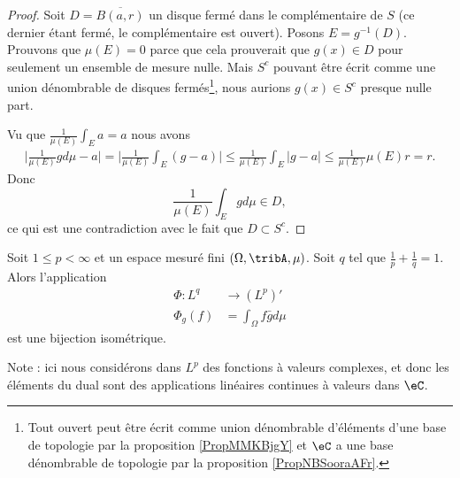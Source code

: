 \begin{proof}
    Soit \( D=\overline{ B(a,r) }\) un disque fermé dans le complémentaire de \( S\) (ce dernier étant fermé, le complémentaire est ouvert). Posons \( E=g^{-1}(D)\). Prouvons que \( \mu(E)=0\) parce que cela prouverait que \( g(x)\in D\) pour seulement un ensemble de mesure nulle. Mais \( S^c\) pouvant être écrit comme une union dénombrable de disques fermés\footnote{Tout ouvert peut être écrit comme union dénombrable d'éléments d'une base de topologie par la proposition \ref{PropMMKBjgY} et \( \eC\) a une base dénombrable de topologie par la proposition \ref{PropNBSooraAFr}.}, nous aurions \( g(x)\in S^c\) presque nulle part.

    Vu que \( \frac{1}{ \mu(E) }\int_Ea=a\) nous avons
    \begin{subequations}
        \begin{align}
            \big| \frac{1}{ \mu(E) }gd\mu-a \big|=\big| \frac{1}{ \mu(E) }\int_E(g-a) \big|\leq  \frac{1}{ \mu(E) }\int_E| g-a |\leq\frac{1}{ \mu(E) }\mu(E)r=r.
        \end{align}
    \end{subequations}
    Donc
    \begin{equation}
        \frac{1}{ \mu(E) }\int_Egd\mu\in D,
    \end{equation}
    ce qui est une contradiction avec le fait que \( D\subset S^c\).
\end{proof}

\begin{theorem}  \label{ThoLPQPooPWBXuv}
    Soit \( 1\leq p<\infty\) et un espace mesuré fini \( (\Omega,\tribA,\mu)\). Soit \( q\) tel que \( \frac{1}{ p }+\frac{1}{ q }=1\). Alors l'application
    \begin{equation}
        \begin{aligned}
            \Phi\colon L^q&\to (L^p)' \\
            \Phi_g(f)&=\int_{\Omega}f\bar gd\mu
        \end{aligned}
    \end{equation}
    est une bijection isométrique.
\end{theorem}
Note : ici nous considérons dans \( L^p\) des fonctions à valeurs complexes, et donc les éléments du dual sont des applications linéaires continues à valeurs dans \( \eC\).

